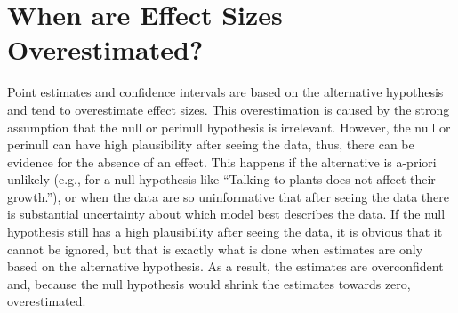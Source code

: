 \documentclass[a4paper]{article}
\begin{document}
\section*{When are Effect Sizes Overestimated?}
Point estimates and confidence intervals are based on the alternative hypothesis and tend to overestimate effect sizes. This overestimation is caused by the strong assumption that the null or perinull hypothesis is irrelevant. However, the null or perinull can have high plausibility after seeing the data, thus, there can be evidence for the absence of an effect. This happens if the alternative is a-priori unlikely (e.g., for a null hypothesis like ``Talking to plants does not affect their growth.''), or when the data are so uninformative that after seeing the data there is substantial uncertainty about which model best describes the data. If the null hypothesis still has a high plausibility after seeing the data, it is obvious that it cannot be ignored, but that is exactly what is done when estimates are only based on the alternative hypothesis. As a result, the estimates are overconfident and, because the null hypothesis would shrink the estimates towards zero, overestimated.
\end{document}
